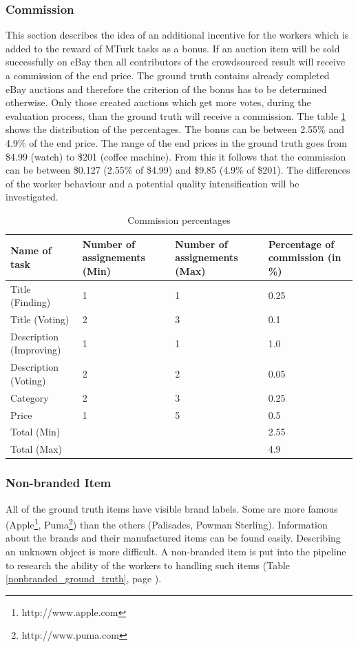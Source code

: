 \subsubsection{Commission}
This section describes the idea of an additional incentive for the workers which is added to the reward of MTurk tasks as a bonus. If an auction item will be sold successfully on eBay then all contributors of the crowdsourced result will receive a commission of the end price. The ground truth contains already completed eBay auctions and therefore the criterion of the bonus has to be determined otherwise. Only those created auctions which get more votes, during the evaluation process, than the ground truth will receive a commission. The table \ref{comm_perc} shows the distribution of the percentages. The bonus can be between 2.55\% and 4.9\% of the end price. The range of the end prices in the ground truth goes from \$4.99 (watch) to \$201 (coffee machine). From this it follows that the commission can be between \$0.127 (2.55\% of \$4.99) and \$9.85 (4.9\% of \$201). The differences of the worker behaviour and a potential quality intensification will be investigated. 
\begin{table}[h!]
	\begin{center}
	\begin{tabular}{| p{3.25cm} | p{3.25cm} | p{3.25cm} | p{3.25cm} |}
		\hline
		Name of task & Number of assignements (Min) & Number of assignements (Max) & Percentage of commission (in \%) \\
		\hline
		Title (Finding) & 1 & 1 & 0.25 \\
		\hline
		Title (Voting) & 2 & 3 & 0.1 \\
		\hline
		Description (Improving) & 1 & 1 & 1.0 \\
		\hline
		Description (Voting) & 2 & 2 & 0.05 \\
		\hline
		Category & 2 & 3 & 0.25 \\
		\hline
		Price & 1 & 5 & 0.5 \\
		\hline
		Total (Min) & & & 2.55 \\
		\hline
		Total (Max) & & & 4.9 \\
		\hline
	\end{tabular}
	\end{center}
	\caption{Commission percentages}
	\label{comm_perc}
\end{table}

\subsubsection{Non-branded Item}
All of the ground truth items have visible brand labels. Some are more famous (Apple\footnote{http://www.apple.com}, Puma\footnote{http://www.puma.com}) than the others (Palisades, Powman Sterling). Information about the brands and their manufactured items can be found easily. Describing an unknown object is more difficult. A non-branded item is put into the pipeline to research the ability of the workers to handling such items (Table \ref{nonbranded_ground_truth}, page \pageref{nonbranded_ground_truth}). 

